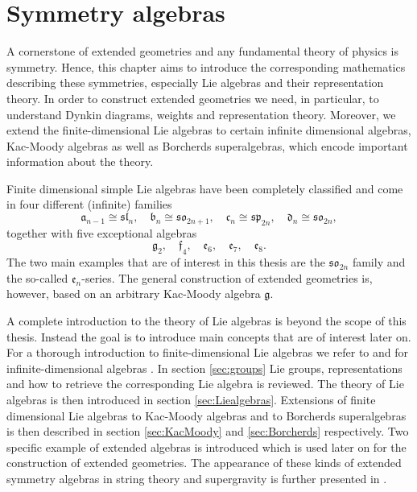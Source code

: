 \chapter{Symmetry algebras}\label{chap:symmetries}
A cornerstone of extended geometries and any fundamental theory of physics is symmetry. Hence, this chapter aims to introduce the corresponding mathematics describing these symmetries, especially Lie algebras and their representation theory. In order to construct extended geometries we need, in particular, to understand Dynkin diagrams, weights and representation theory. Moreover, we extend the finite-dimensional Lie algebras to certain infinite dimensional algebras, Kac-Moody algebras as well as Borcherds superalgebras, which encode important information about the theory. 

Finite dimensional simple Lie algebras have been completely classified and come in four different (infinite) families 
\begin{equation*}
    \mathfrak{a}_{n-1} \cong \mathfrak{sl}_{n},\quad \mathfrak{b}_{n}\cong \mathfrak{so}_{2n+1},\quad \mathfrak{c}_{n} \cong \mathfrak{sp}_{2n},\quad \mathfrak{d}_{n}\cong \mathfrak{so}_{2n},
\end{equation*}
together with five exceptional algebras
\begin{equation*}
    \mathfrak{g}_2,\quad \mathfrak{f}_4,\quad\mathfrak{e_6},\quad \mathfrak{e_7},\quad \mathfrak{e_8}.
\end{equation*}
The two main examples that are of interest in this thesis are the $\mathfrak{so}_{2n}$ family and the so-called $\mathfrak{e}_n$-series. The general construction of extended geometries is, however, based on an arbitrary Kac-Moody algebra $\mathfrak{g}$. 

A complete introduction to the theory of Lie algebras is beyond the scope of this thesis. Instead the goal is to introduce main concepts that are of interest later on. For a thorough introduction to finite-dimensional Lie algebras we refer to \cite{Fuchs1997,FultonHarris2004,Gaberdiel2013} and for infinite-dimensional algebras \cite{Kac1990}. In section \ref{sec:groups} Lie groups, representations and how to retrieve the corresponding Lie algebra is reviewed. The theory of Lie algebras is then introduced in section \ref{sec:Liealgebras}. Extensions of finite dimensional Lie algebras to Kac-Moody algebras and to Borcherds superalgebras is then described in section \ref{sec:KacMoody} and \ref{sec:Borcherds} respectively. Two specific example of extended algebras is introduced which is used later on for the construction of extended geometries. The appearance of these kinds of extended symmetry algebras in string theory and supergravity is further presented in \cite{CederwallPalmkvistSuperalgebras2015,Aldazabal2014,Palmkvist2015ExpGeomSuperAlg,deWitTensorHierarchies2008}.



